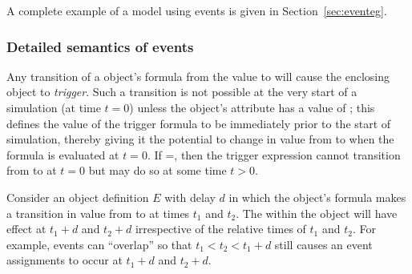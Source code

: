 A complete example of a model using events is given in
Section~\ref{sec:eventeg}.


\subsubsection{Detailed semantics of events}
\label{sec:event-semantics}

Any transition of a \Trigger object's  formula from
the value  to  will cause the enclosing
\Event object to \emph{trigger}.  Such a transition is not possible
at the very start of a simulation (\ie at time $t = 0$) unless the
\Trigger object's  attribute has a value of
; this defines the value of the trigger formula to be
 immediately prior to the start of simulation, thereby
giving it the potential to change in value from  to
 when the formula is evaluated at $t = 0$.  If
=, then the trigger expression
cannot transition from  to  at $t = 0$ but
may do so at some time $t > 0$.

Consider an \Event object definition $E$ with delay $d$ in which
the \Trigger object's  formula makes a transition in
value from  to  at times $t_1$ and $t_2$.
The \EventAssignment within the \Event object will have effect at
$t_1+d$ and $t_2+d$ irrespective of the relative times of $t_1$
and $t_2$.  For example, events can ``overlap'' so that $t_1 < t_2
< t_1+d$ still causes an event assignments to occur at $t_1+d$ and
$t_2+d$.

